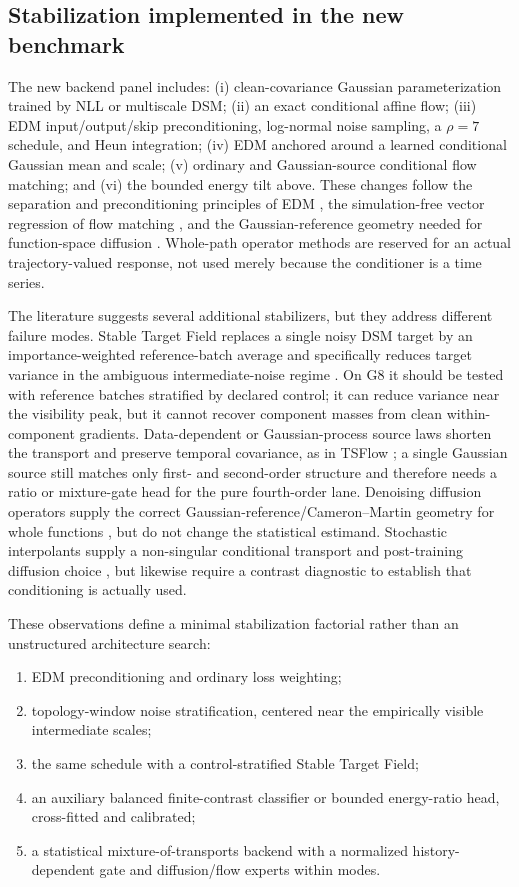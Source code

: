 \documentclass[10pt]{article}
\begin{document}
\subsection{Stabilization implemented in the new benchmark}

The new backend panel includes: (i) clean-covariance Gaussian parameterization
trained by NLL or multiscale DSM; (ii) an exact conditional affine flow;
(iii) EDM input/output/skip preconditioning, log-normal noise sampling, a
$\rho=7$ schedule, and Heun integration; (iv) EDM anchored around a learned
conditional Gaussian mean and scale; (v) ordinary and Gaussian-source conditional
flow matching; and (vi) the bounded energy tilt above.  These changes follow the
separation and preconditioning principles of EDM \cite{karras2022}, the
simulation-free vector regression of flow matching \cite{lipman2023}, and the
Gaussian-reference geometry needed for function-space diffusion \cite{lim2023}.
Whole-path operator methods are reserved for an actual
trajectory-valued response, not used merely because the conditioner is a time
series.

The literature suggests several additional stabilizers, but they address
different failure modes.  Stable Target Field replaces a single noisy DSM target
by an importance-weighted reference-batch average and specifically reduces target
variance in the ambiguous intermediate-noise regime \cite{xu2023stf}.  On G8 it
should be tested with reference batches stratified by declared control; it can
reduce variance near the visibility peak, but it cannot recover component masses
from clean within-component gradients.  Data-dependent or Gaussian-process source
laws shorten the transport and preserve temporal covariance, as in TSFlow
\cite{kollovieh2024}; a single Gaussian source still matches only first- and
second-order structure and therefore needs a ratio or mixture-gate head for the
pure fourth-order lane.  Denoising diffusion operators supply the correct
Gaussian-reference/Cameron--Martin geometry for whole functions \cite{lim2023},
but do not change the statistical estimand.  Stochastic interpolants supply a
non-singular conditional transport and post-training diffusion choice
\cite{chen2024}, but likewise require a contrast diagnostic to establish that
conditioning is actually used.

These observations define a minimal stabilization factorial rather than an
unstructured architecture search:

\begin{enumerate}
  \item EDM preconditioning and ordinary loss weighting;
  \item topology-window noise stratification, centered near the empirically
  visible intermediate scales;
  \item the same schedule with a control-stratified Stable Target Field;
  \item an auxiliary balanced finite-contrast classifier or bounded energy-ratio
  head, cross-fitted and calibrated;
  \item a statistical mixture-of-transports backend with a normalized
  history-dependent gate and diffusion/flow experts within modes.
\end{enumerate}
\end{document}
